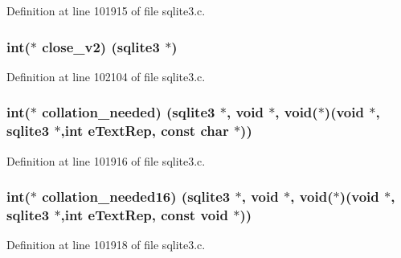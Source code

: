 Definition at line 101915 of file sqlite3.\+c.

\hypertarget{structsqlite3__api__routines_a2f172367a40d5e1c0709deb177f2a81e}{}
\subsubsection[{close\+\_\+v2}]{\setlength{\rightskip}{0pt plus 5cm}int($\ast$ close\+\_\+v2) ({\bf sqlite3} $\ast$)}\label{structsqlite3__api__routines_a2f172367a40d5e1c0709deb177f2a81e}


Definition at line 102104 of file sqlite3.\+c.

\hypertarget{structsqlite3__api__routines_ab8f092534ece161ead0aab80770984e1}{}
\subsubsection[{collation\+\_\+needed}]{\setlength{\rightskip}{0pt plus 5cm}int($\ast$ collation\+\_\+needed) ({\bf sqlite3} $\ast$, void $\ast$, void($\ast$)(void $\ast$, {\bf sqlite3} $\ast$,int e\+Text\+Rep, const char $\ast$))}\label{structsqlite3__api__routines_ab8f092534ece161ead0aab80770984e1}


Definition at line 101916 of file sqlite3.\+c.

\hypertarget{structsqlite3__api__routines_af506e60ba603419f01920da2968776ad}{}
\subsubsection[{collation\+\_\+needed16}]{\setlength{\rightskip}{0pt plus 5cm}int($\ast$ collation\+\_\+needed16) ({\bf sqlite3} $\ast$, void $\ast$, void($\ast$)(void $\ast$, {\bf sqlite3} $\ast$,int e\+Text\+Rep, const void $\ast$))}\label{structsqlite3__api__routines_af506e60ba603419f01920da2968776ad}


Definition at line 101918 of file sqlite3.\+c.

